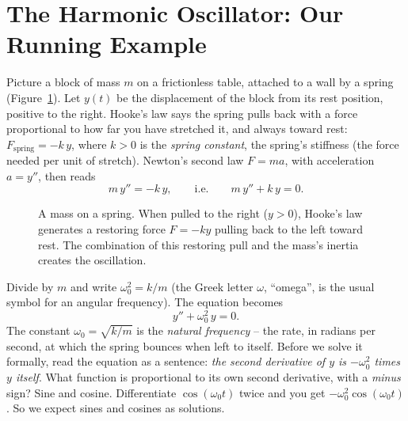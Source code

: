\section{The Harmonic Oscillator: Our Running Example}
\label{ch38:oscillator}

Picture a block of mass $m$ on a frictionless table, attached to a wall by a
spring (Figure~\ref{ch38:fig-spring}). Let $y(t)$ be the displacement of the
block from its rest position, positive to the right. Hooke's law says the spring
pulls back with a force proportional to how far you have stretched it, and
always toward rest: $F_{\text{spring}} = -k\,y$, where $k > 0$ is the \emph{spring
constant}, the spring's stiffness (the force needed per unit of stretch). Newton's
second law $F = ma$, with acceleration $a = y''$, then reads
\[
  m\,y'' = -k\,y,
  \qquad\text{i.e.}\qquad
  m\,y'' + k\,y = 0.
\]

\begin{figure}[htbp]
\centering
{}
\caption{A mass on a spring. When pulled to the right ($y > 0$), Hooke's law
generates a restoring force $F = -ky$ pulling back to the left toward rest. The
combination of this restoring pull and the mass's inertia creates the oscillation.}
\label{ch38:fig-spring}
\end{figure}

Divide by $m$ and write $\omega_0^2 = k/m$ (the Greek letter $\omega$,
``omega'', is the usual symbol for an angular frequency). The equation becomes
\begin{equation}
  y'' + \omega_0^2\, y = 0.
  \label{ch38:sho}
\end{equation}
The constant $\omega_0 = \sqrt{k/m}$ is the \emph{natural frequency} -- the rate,
in radians per second, at which the spring bounces when left to
itself. Before we solve it formally, read the equation as a sentence: \emph{the
second derivative of $y$ is $-\omega_0^2$ times $y$ itself}. What function is
proportional to its own second derivative, with a \emph{minus} sign? Sine and
cosine. Differentiate $\cos(\omega_0 t)$ twice and you get
$-\omega_0^2 \cos(\omega_0 t)$. So we expect sines and cosines as solutions.

